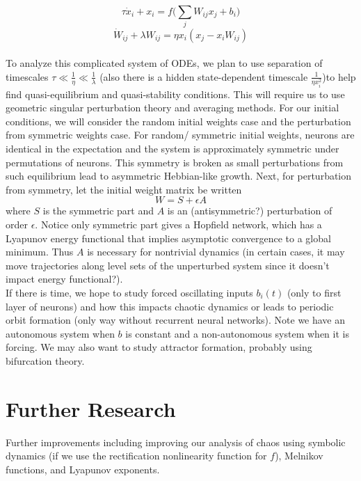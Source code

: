 \documentclass{article}
\begin{document}
\begin{equation}
    \tau \dot{x}_i + x_i = f\bigg(\sum_j W_{ij} x_j + b_i\bigg)
\end{equation}
\begin{equation}
    \dot{W}_{ij} +\lambda W_{ij} = \eta x_i (x_j - x_iW_{ij})
\end{equation}
\\
To analyze this complicated system of ODEs, we plan to use separation of timescales $\tau \ll \frac{1}{\eta} \ll \frac{1}{\lambda}$ (also there is a hidden state-dependent timescale $\frac{1}{\eta x_i^2}$)to help find quasi-equilibrium and quasi-stability conditions. This will require us to use geometric singular perturbation theory and averaging methods. For our initial conditions, we will consider the random initial weights case and the perturbation from symmetric weights case. For random/ symmetric initial weights, neurons are identical in the expectation and the system is approximately symmetric under permutations of neurons. This symmetry is broken as small perturbations from such equilibrium lead to asymmetric Hebbian-like growth. Next, for perturbation from symmetry, let the initial weight matrix be written
\begin{equation}
    W = S + \epsilon A
\end{equation}
where $S$ is the symmetric part and $A$ is an (antisymmetric?) perturbation of order $\epsilon$. Notice only symmetric part gives a Hopfield network, which has a Lyapunov energy functional that implies asymptotic convergence to a global minimum. Thus $A$ is necessary for nontrivial dynamics (in certain cases, it may move trajectories along level sets of the unperturbed system since it doesn't impact energy functional?).
\vspace{0.25cm}
\\
\hspace{0.5cm} If there is time, we hope to study forced oscillating inputs $b_i(t)$ (only to first layer of neurons) and how this impacts chaotic dynamics or leads to periodic orbit formation (only way without recurrent neural networks). Note we have an autonomous system when $b$ is constant and a non-autonomous system when it is forcing. We may also want to study attractor formation, probably using bifurcation theory.

\section*{Further Research}
Further improvements including improving our analysis of chaos using symbolic dynamics (if we use the rectification nonlinearity function for $f$), Melnikov functions, and Lyapunov exponents.
\end{document}
